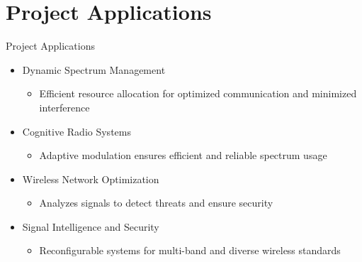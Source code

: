 \section{Project Applications}
\begin{frame}{Project Applications}
    \begin{itemize}
        \item Dynamic Spectrum Management \vfill
        \begin{itemize}
            \item Efficient resource allocation for optimized communication and minimized interference \vfill
        \end{itemize}
        \item Cognitive Radio Systems \vfill
        \begin{itemize}
            \item Adaptive modulation ensures efficient and reliable spectrum usage \vfill
        \end{itemize}
        \item Wireless Network Optimization \vfill
        \begin{itemize}
            \item Analyzes signals to detect threats and ensure security \vfill
        \end{itemize}
        \item Signal Intelligence and Security \vfill
        \begin{itemize}
            \item Reconfigurable systems for multi-band and diverse wireless standards \vfill
        \end{itemize}
    \end{itemize}
\end{frame}
